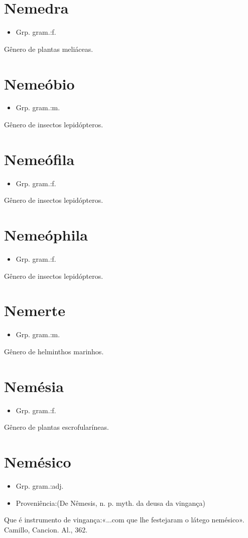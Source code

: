 \section{Nemedra}
\begin{itemize}
\item {Grp. gram.:f.}
\end{itemize}
Gênero de plantas meliáceas.
\section{Nemeóbio}
\begin{itemize}
\item {Grp. gram.:m.}
\end{itemize}
Gênero de insectos lepidópteros.
\section{Nemeófila}
\begin{itemize}
\item {Grp. gram.:f.}
\end{itemize}
Gênero de insectos lepidópteros.
\section{Nemeóphila}
\begin{itemize}
\item {Grp. gram.:f.}
\end{itemize}
Gênero de insectos lepidópteros.
\section{Nemerte}
\begin{itemize}
\item {Grp. gram.:m.}
\end{itemize}
Gênero de helminthos marinhos.
\section{Nemésia}
\begin{itemize}
\item {Grp. gram.:f.}
\end{itemize}
Gênero de plantas escrofularíneas.
\section{Nemésico}
\begin{itemize}
\item {Grp. gram.:adj.}
\end{itemize}
\begin{itemize}
\item {Proveniência:(De \textunderscore Nêmesis\textunderscore , n. p. myth. da deusa da vingança)}
\end{itemize}
Que é instrumento de vingança:«\textunderscore ...com que lhe festejaram o látego nemésico\textunderscore ». Camillo, \textunderscore Cancion. Al.\textunderscore , 362.

